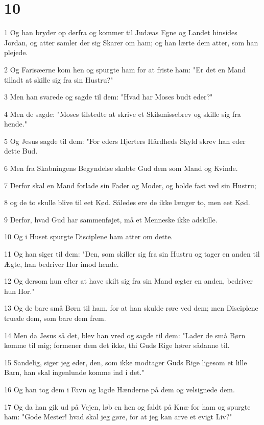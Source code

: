 \chapter{10}

\par 1 Og han bryder op derfra og kommer til Judæas Egne og Landet hinsides Jordan, og atter samler der sig Skarer om ham; og han lærte dem atter, som han plejede.
\par 2 Og Farisæerne kom hen og spurgte ham for at friste ham: "Er det en Mand tilladt at skille sig fra sin Hustru?"
\par 3 Men han svarede og sagde til dem: "Hvad har Moses budt eder?"
\par 4 Men de sagde: "Moses tilstedte at skrive et Skilsmissebrev og skille sig fra hende."
\par 5 Og Jesus sagde til dem: "For eders Hjerters Hårdheds Skyld skrev han eder dette Bud.
\par 6 Men fra Skabningens Begyndelse skabte Gud dem som Mand og Kvinde.
\par 7 Derfor skal en Mand forlade sin Fader og Moder, og holde fast ved sin Hustru;
\par 8 og de to skulle blive til eet Kød. Således ere de ikke længer to, men eet Kød.
\par 9 Derfor, hvad Gud har sammenføjet, må et Menneske ikke adskille.
\par 10 Og i Huset spurgte Disciplene ham atter om dette.
\par 11 Og han siger til dem: "Den, som skiller sig fra sin Hustru og tager en anden til Ægte, han bedriver Hor imod hende.
\par 12 Og dersom hun efter at have skilt sig fra sin Mand ægter en anden, bedriver hun Hor."
\par 13 Og de bare små Børn til ham, for at han skulde røre ved dem; men Disciplene truede dem, som bare dem frem.
\par 14 Men da Jesus så det, blev han vred og sagde til dem: "Lader de små Børn komme til mig; formener dem det ikke, thi Guds Rige hører sådanne til.
\par 15 Sandelig, siger jeg eder, den, som ikke modtager Guds Rige ligesom et lille Barn, han skal ingenlunde komme ind i det."
\par 16 Og han tog dem i Favn og lagde Hænderne på dem og velsignede dem.
\par 17 Og da han gik ud på Vejen, løb en hen og faldt på Knæ for ham og spurgte ham: "Gode Mester! hvad skal jeg gøre, for at jeg kan arve et evigt Liv?"
